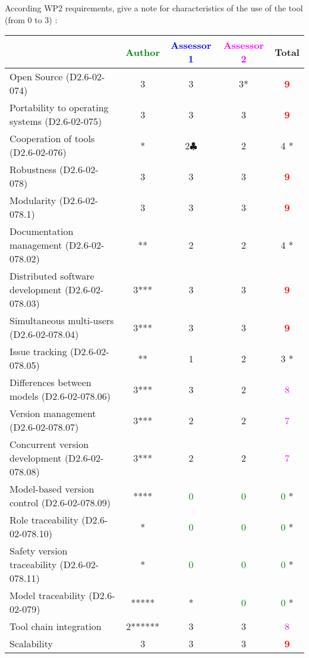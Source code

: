 According WP2 requirements, give a note for characteristics of the use of the tool (from 0 to 3) :

\begin{tabular}{|l | c | c | c | c|}
\hline
& \textcolor{green}{Author} & \textcolor{blue}{Assessor 1} & \textcolor{magenta}{Assessor 2} & Total \\
\hline
Open Source (D2.6-02-074) &3 &3 &3* & \textcolor{red}{\textbf{9}} \\
\hline
Portability to operating systems (D2.6-02-075) &3 &3 &3 & \textcolor{red}{\textbf{9}} \\
\hline
Cooperation of tools (D2.6-02-076) &* &2$\clubsuit$ &2 & 4    * \\
\hline
Robustness (D2.6-02-078) &3 &3 &3 & \textcolor{red}{\textbf{9}} \\
\hline
Modularity (D2.6-02-078.1) &3 &3 &3 & \textcolor{red}{\textbf{9}} \\
\hline
Documentation management (D2.6-02-078.02) &** &2 &2 & 4    * \\
\hline
Distributed software development (D2.6-02-078.03) &3*** &3 &3 & \textcolor{red}{\textbf{9}} \\
\hline
Simultaneous multi-users (D2.6-02-078.04) &3*** & 3    &3 & \textcolor{red}{\textbf{9}} \\
\hline
Issue tracking (D2.6-02-078.05) &** &1 &2 & 3    * \\
\hline
Differences between models (D2.6-02-078.06) &3*** &3 &2 & \textcolor{magenta}{8} \\
\hline
Version management (D2.6-02-078.07) &3*** &2 &2 & \textcolor{magenta}{7} \\
\hline
Concurrent version development (D2.6-02-078.08) &3*** &2 &2 & \textcolor{magenta}{7} \\
\hline
Model-based version control (D2.6-02-078.09) &**** & \textcolor{green}{0}   & \textcolor{green}{0}   & \textcolor{green}{0} * \\
\hline
Role traceability (D2.6-02-078.10) &* & \textcolor{green}{0}   & \textcolor{green}{0}   & \textcolor{green}{0} * \\
\hline
Safety version traceability (D2.6-02-078.11) &* & \textcolor{green}{0}   & \textcolor{green}{0}   & \textcolor{green}{0} * \\
\hline
Model traceability (D2.6-02-079) &***** & * & \textcolor{green}{0}   & \textcolor{green}{0} * \\
\hline
Tool chain integration &2****** &3 &3 & \textcolor{magenta}{8} \\
\hline
Scalability &3 &3 &3 & \textcolor{red}{\textbf{9}} \\
\hline
\end{tabular}

